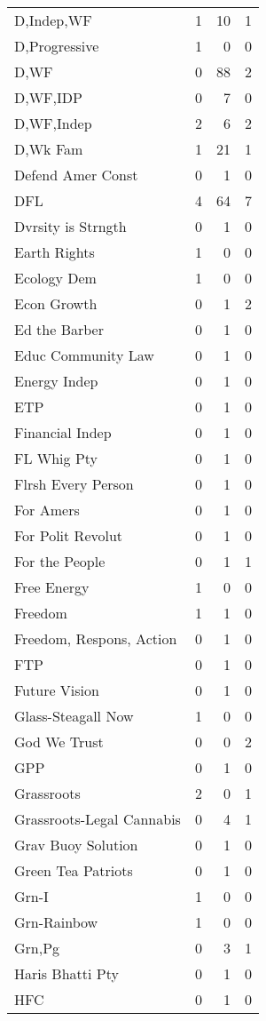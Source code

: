 \begin{supertabular}{lrrr}
D,Indep,WF & 1 & 10 & 1\\
D,Progressive & 1 & 0 & 0\\
D,WF & 0 & 88 & 2\\
D,WF,IDP & 0 & 7 & 0\\
D,WF,Indep & 2 & 6 & 2\\
D,Wk Fam & 1 & 21 & 1\\
Defend Amer Const & 0 & 1 & 0\\
DFL & 4 & 64 & 7\\
Dvrsity is Strngth & 0 & 1 & 0\\
Earth Rights & 1 & 0 & 0\\
Ecology Dem & 1 & 0 & 0\\
Econ Growth & 0 & 1 & 2\\
Ed the Barber & 0 & 1 & 0\\
Educ Community Law & 0 & 1 & 0\\
Energy Indep & 0 & 1 & 0\\
ETP & 0 & 1 & 0\\
Financial Indep & 0 & 1 & 0\\
FL Whig Pty & 0 & 1 & 0\\
Flrsh Every Person & 0 & 1 & 0\\
For Amers & 0 & 1 & 0\\
For Polit Revolut & 0 & 1 & 0\\
For the People & 0 & 1 & 1\\
Free Energy & 1 & 0 & 0\\
Freedom & 1 & 1 & 0\\
Freedom, Respons, Action & 0 & 1 & 0\\
FTP & 0 & 1 & 0\\
Future Vision & 0 & 1 & 0\\
Glass-Steagall Now & 1 & 0 & 0\\
God We Trust & 0 & 0 & 2\\
GPP & 0 & 1 & 0\\
Grassroots & 2 & 0 & 1\\
Grassroots-Legal Cannabis & 0 & 4 & 1\\
Grav Buoy Solution & 0 & 1 & 0\\
Green Tea Patriots & 0 & 1 & 0\\
Grn-I & 1 & 0 & 0\\
Grn-Rainbow & 1 & 0 & 0\\
Grn,Pg & 0 & 3 & 1\\
Haris Bhatti Pty & 0 & 1 & 0\\
HFC & 0 & 1 & 0\\

\end{supertabular}
